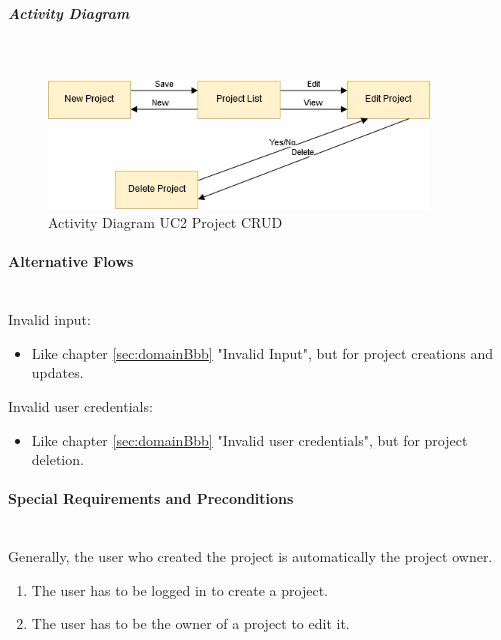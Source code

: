 \newpage
\subparagraph{Activity Diagram}\mbox{}\\
\begin{figure}[H]
	\centering
	\includegraphics[width=0.9\textwidth]{Content/Domain/UC2ProjectCRUDactivitydiagram.png}
	\caption{Activity Diagram \ac{UC}2 Project CRUD}
	\label{fig:activityDiagramUC2}
\end{figure}

\paragraph*{Alternative Flows}\mbox{}\\

\noindent
Invalid input: 
\begin{itemize}
	\vspace{-3mm}
	\setlength\itemsep{-1em}
	\item Like chapter \ref{sec:domainBbb} "Invalid Input", but for project creations and updates.
\end{itemize}

\noindent
Invalid user credentials:
\begin{itemize}
	\vspace{-3mm}
	\setlength\itemsep{-1em}
	\item Like chapter \ref{sec:domainBbb} "Invalid user credentials", but for project deletion.
\end{itemize}

\paragraph*{Special Requirements and Preconditions}\mbox{}\\
Generally, the user who created the project is automatically the project owner.
\begin{enumerate}
	\vspace{-3mm}
	\setlength\itemsep{-1em}
	\item The user has to be logged in to create a project. 
	\item The user has to be the owner of a project to edit it.
\end{enumerate}

